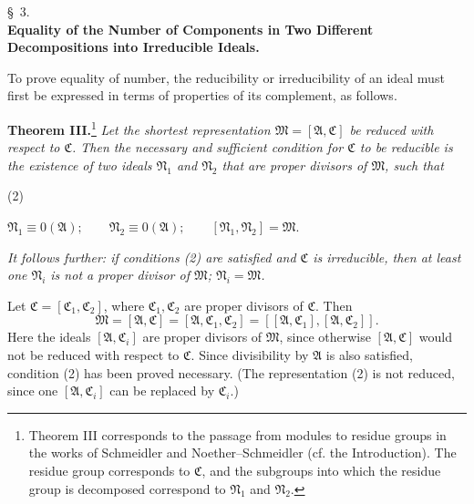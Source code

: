 \documentclass[11pt]{article}
\providecommand{\srcnumdisplay}[3][3.4em]{%
  \par\smallskip\noindent
  \begin{minipage}[t]{#1}\vspace*{0pt}#2\end{minipage}%
  \begin{minipage}[t]{\dimexpr\linewidth-#1\relax}\vspace*{0pt}\centering
  \(\displaystyle #3\)
  \end{minipage}\par\smallskip}
\providecommand{\ideal}[1]{\mathfrak{#1}}
\begin{document}
\begin{center}
\S~3.\\[0.25em]
\textbf{Equality of the Number of Components in Two Different Decompositions into Irreducible Ideals.}
\end{center}

To prove equality of number, the reducibility or irreducibility of an ideal must first be expressed in terms of properties of its complement, as follows.

\textbf{Theorem III.}\footnote{Theorem III corresponds to the passage from modules to residue groups in the works of Schmeidler and Noether--Schmeidler (cf. the Introduction). The residue group corresponds to $\ideal C$, and the subgroups into which the residue group is decomposed correspond to $\ideal N_1$ and $\ideal N_2$.} \emph{Let the shortest representation $\ideal M=[\ideal A,\ideal C]$ be reduced with respect to $\ideal C$. Then the necessary and sufficient condition for $\ideal C$ to be reducible is the existence of two ideals $\ideal N_1$ and $\ideal N_2$ that are proper divisors of $\ideal M$, such that}
\srcnumdisplay[3.1em]{(2)}{\ideal N_1\equiv0(\ideal A);\qquad
 \ideal N_2\equiv0(\ideal A);\qquad
 [\ideal N_1,\ideal N_2]=\ideal M.}
\emph{It follows further: if conditions (2) are satisfied and $\ideal C$ is irreducible, then at least one $\ideal N_i$ is not a proper divisor of $\ideal M$; $\ideal N_i=\ideal M$.}

Let $\ideal C=[\ideal C_1,\ideal C_2]$, where $\ideal C_1,\ideal C_2$ are proper divisors of $\ideal C$. Then
\[
 \ideal M=[\ideal A,\ideal C]=[\ideal A,\ideal C_1,\ideal C_2]
       =[[\ideal A,\ideal C_1],[\ideal A,\ideal C_2]].
\]
Here the ideals $[\ideal A,\ideal C_i]$ are proper divisors of $\ideal M$, since otherwise $[\ideal A,\ideal C]$ would not be reduced with respect to $\ideal C$. Since divisibility by $\ideal A$ is also satisfied, condition (2) has been proved necessary. (The representation (2) is not reduced, since one $[\ideal A,\ideal C_i]$ can be replaced by $\ideal C_i$.)
\end{document}
